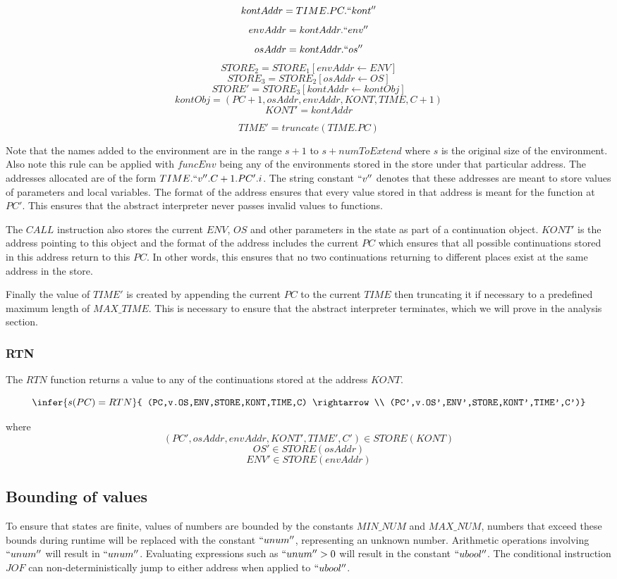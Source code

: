 \documentclass[12pt]{article}
\begin{document}
$$kontAddr = TIME.PC.``kont''$$
$$envAddr = kontAddr.``env''$$
$$osAddr = kontAddr.``os''$$
$$STORE_2=STORE_1[envAddr \leftarrow ENV]$$
$$STORE_3=STORE_2[osAddr \leftarrow OS]$$
$$STORE'=STORE_3[kontAddr \leftarrow kontObj]$$
$$kontObj = (PC+1,osAddr,envAddr,KONT,TIME,C+1)$$
$$KONT' = kontAddr$$

$$TIME' = truncate(TIME.PC)$$

Note that the names added to the environment are in the range $s+1$ to $s+numToExtend$ where $s$ is the original size of the environment. Also note this rule can be applied with $funcEnv$ being any of the environments stored in the store under that particular address. The addresses allocated are of the form $TIME.``v''.C+1.PC'.i$. The string constant $``v''$ denotes that these addresses are meant to store values of parameters and local variables. The format of the address ensures that every value stored in that address is meant for the function at $PC'$. This ensures that the abstract interpreter never passes invalid values to functions.

The $CALL$ instruction also stores the current $ENV$, $OS$ and other parameters in the state as part of a continuation object. $KONT'$ is the address pointing to this object and the format of the address includes the current $PC$ which ensures that all possible continuations stored in this address return to this $PC$. In other words, this ensures that no two continuations returning to different places exist at the same address in the store.

Finally the value of $TIME'$ is created by appending the current $PC$ to the current $TIME$ then truncating it if necessary to a predefined maximum length of $MAX\_TIME$. This is necessary to ensure that the abstract interpreter terminates, which we will prove in the analysis section.

\subsubsection{RTN}
The $RTN$ function returns a value to any of the continuations stored at the address $KONT$.

$$\infer{s(PC) = RTN}{
    (PC,v.OS,ENV,STORE,KONT,TIME,C) \rightarrow \\
    (PC',v.OS',ENV',STORE,KONT',TIME',C')}$$

where
$$(PC',osAddr,envAddr,KONT',TIME',C') \in STORE(KONT)$$
$$OS' \in STORE(osAddr)$$
$$ENV' \in STORE(envAddr)$$

\subsection{Bounding of values}
To ensure that states are finite, values of numbers are bounded by the constants $MIN\_NUM$ and $MAX\_NUM$, numbers that exceed these bounds during runtime will be replaced with the constant $``unum''$, representing an unknown number. Arithmetic operations involving $``unum''$ will result in $``unum''$. Evaluating expressions such as $``unum'' > 0$ will result in the constant $``ubool''$. The conditional instruction $JOF$ can non-deterministically jump to either address when applied to $``ubool''$.
\end{document}

